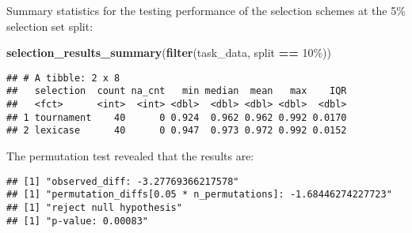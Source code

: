 \documentclass[
]{book}
\newenvironment{Shaded}{\begin{snugshade}}{\end{snugshade}}
\newcommand{\AttributeTok}[1]{\textcolor[rgb]{0.13,0.29,0.53}{#1}}
\newcommand{\DecValTok}[1]{\textcolor[rgb]{0.00,0.00,0.81}{#1}}
\newcommand{\FunctionTok}[1]{\textcolor[rgb]{0.13,0.29,0.53}{\textbf{#1}}}
\newcommand{\NormalTok}[1]{#1}
\newcommand{\OtherTok}[1]{\textcolor[rgb]{0.56,0.35,0.01}{#1}}
\newcommand{\SpecialCharTok}[1]{\textcolor[rgb]{0.81,0.36,0.00}{\textbf{#1}}}
\newcommand{\StringTok}[1]{\textcolor[rgb]{0.31,0.60,0.02}{#1}}
\begin{document}
Summary statistics for the testing performance of the selection schemes at the 5\% selection set split:

\begin{Shaded}
\begin{Highlighting}[]
\FunctionTok{selection\_results\_summary}\NormalTok{(}\FunctionTok{filter}\NormalTok{(task\_data, split }\SpecialCharTok{==} \StringTok{\textquotesingle{}10\%\textquotesingle{}}\NormalTok{))}
\end{Highlighting}
\end{Shaded}

\begin{verbatim}
## # A tibble: 2 x 8
##   selection  count na_cnt   min median  mean   max    IQR
##   <fct>      <int>  <int> <dbl>  <dbl> <dbl> <dbl>  <dbl>
## 1 tournament    40      0 0.924  0.962 0.962 0.992 0.0170
## 2 lexicase      40      0 0.947  0.973 0.972 0.992 0.0152
\end{verbatim}

The permutation test revealed that the results are:

\begin{Shaded}
\end{Shaded}

\begin{verbatim}
## [1] "observed_diff: -3.27769366217578"
## [1] "permutation_diffs[0.05 * n_permutations]: -1.68446274227723"
## [1] "reject null hypothesis"
## [1] "p-value: 0.00083"
\end{verbatim}
\end{document}
